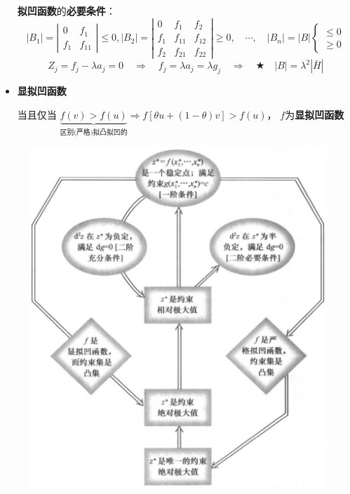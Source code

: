 \documentclass[12pt, a4paper, oneside]{article}
\begin{document}
\begin{CJK*}{UTF8}{gbsn}
\begin{itemize}
$$		$$
		\textbf{拟凹函数}的\textbf{必要条件}：
		$$
		\left|B_{1}\right|=\left|\begin{array}{ll}0 & f_{1} \\ f_{1} & f_{11}\end{array}\right| \leqslant 0, 
		\left|B_{2}\right|=\left|\begin{array}{lll}0 & f_{1} & f_{2} \\ f_{1} & f_{11} & f_{12} \\ f_{2} & f_{21} & f_{22}\end{array}\right|\geqslant 0, 
		\quad \cdots, \quad
		\left|B_{n}\right|=|B|
		\left\{
		\begin{array}{l}
			\leqslant 0 \\
			\geqslant 0
		\end{array}
		\right.
		$$
		$$
		Z_j=f_j-\lambda a_j = 0
		\quad\Rightarrow\quad
		f_j=\lambda a_j = \lambda g_j
		\quad\Rightarrow\quad
		\bigstar \quad \boxed{|B|=\lambda^2|\bar{H}|}
		$$
	\item \textbf{显拟凹函数}
		
		当且仅当
		$
		\underbrace{f(v)>f(u)}_{\text{区别(严格)拟凸拟凹}的} 
		\Longrightarrow
		f[\theta u+(1-\theta) v] > f(u) 
		$，
		$f$为\textbf{显拟凹函数}
\end{itemize}
\begin{figure}[htpb]
  \begin{center}
    \includegraphics[width=1 \linewidth]
    {pic/constrained_extreme_value.png}
  \end{center}
\end{figure}


\end{CJK*}
\end{document}
